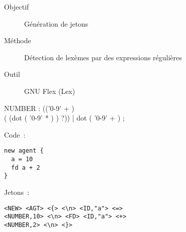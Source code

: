 \begin{frame}
	\begin{description}
		\item [Objectif] Génération de jetons
		\item [Méthode] Détection de lexèmes par des expressions régulières
		\item [Outil] GNU Flex (Lex)
	\end{description}
\end{frame}

\begin{frame}[fragile]
	\begin{rail}
		NUMBER : (('0-9' + ) \\ ( (dot ( '0-9' * ) ) ?))
		| dot ( '0-9' + ) ;
	\end{rail}
\end{frame}

\begin{frame}[fragile]
	Code~:
	\begin{lstlisting}[language=Stibbons]
new agent {
  a = 10
  fd a + 2
}
	\end{lstlisting}
	Jetons~:
	\begin{lstlisting}[breaklines]
<NEW> <AGT> <{> <\n> <ID,"a"> <=> 
<NUMBER,10> <\n> <FD> <ID,"a"> <+> 
<NUMBER,2> <\n> <}>
	\end{lstlisting}
\end{frame}
